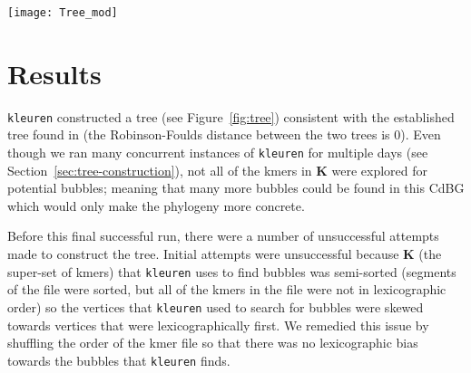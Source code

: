 \documentclass[hidelinks, 10pt, conference, compsocconf]{IEEEtran}
\begin{document}
\begin{figure*}
\centering
\texttt{[image: Tree\_mod]}

\caption{The phylogenetic tree of 12 \textit{Drosophila} species constructed using \texttt{kleuren}. 
This tree resulted from using a kmer size of 17 and required all species to contain a vertex in order for the algorithm to search for a bubble starting at that vertex; and this tree is consistent with the established tree for these 12 species.
\label{fig:tree}}
\end{figure*}

\section{Results}\label{results}

\texttt{kleuren} constructed a tree (see Figure~\ref{fig:tree}) consistent with the established tree found in \cite{Hahn-true-tree} (the Robinson-Foulds distance \cite{Robinson1981} between the two trees is 0).
Even though we ran many concurrent instances of \texttt{kleuren} for multiple days (see Section~\ref{sec:tree-construction}), not all of the kmers in $\mathbf{K}$ were explored for potential bubbles; meaning that many more bubbles could be found in this CdBG which would only make the phylogeny more concrete.

Before this final successful run, there were a number of unsuccessful attempts made to construct the tree.
Initial attempts were unsuccessful because $\mathbf{K}$ (the super-set of kmers) that \texttt{kleuren} uses to find bubbles was semi-sorted (segments of the file were sorted, but all of the kmers in the file were not in lexicographic order) so the vertices that \texttt{kleuren} used to search for bubbles were skewed towards vertices that were lexicographically first.
We remedied this issue by shuffling the order of the kmer file so that there was no lexicographic bias towards the bubbles that \texttt{kleuren} finds.
\end{document}
